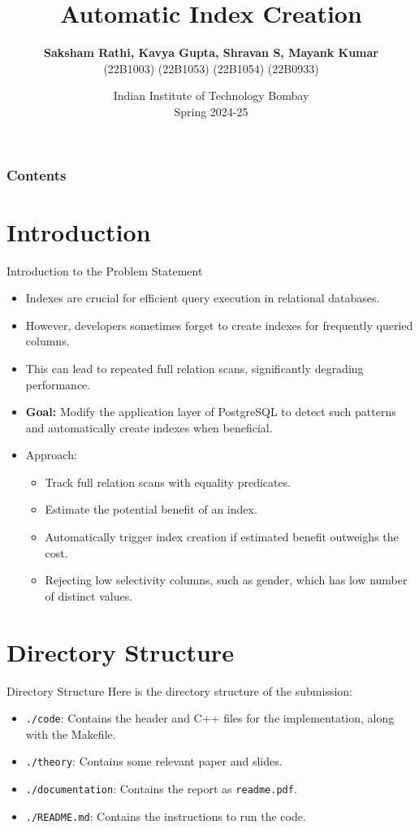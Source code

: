 \documentclass[Serif, 10pt, brown]{beamer}
\title[{DBIS}]{\sc Automatic Index Creation}
\author[\ul{Authors}]{{\bf { Saksham Rathi, Kavya Gupta, Shravan S, Mayank Kumar}}\\ {\footnotesize \hspace{0cm} (22B1003) \hspace{1cm} (22B1053) \hspace{0.5cm} (22B1054) \hspace{0.5cm} (22B0933)}}
\institute[UTD]{\sc\small CS349: DataBase and Information Systems\\ Under Prof. Sudarshan and Prof. Suraj}
\date[UCI]{Indian Institute of Technology Bombay \\ Spring 2024-25}
\theoremstyle{example}
\theoremstyle{plain}
\begin{document}
\frame{\titlepage}
%
%


\begin{frame}
	\transblindsvertical
	\frametitle{Contents}
	\tableofcontents[hidesubsections]
\end{frame}
\section{Introduction}
\begin{frame}{Introduction to the Problem Statement}

	\begin{itemize}
		\item Indexes are crucial for efficient query execution in relational databases.
		\item However, developers sometimes forget to create indexes for frequently queried columns.
		\item This can lead to repeated full relation scans, significantly degrading performance.
		\item {\bf Goal:} Modify the application layer of PostgreSQL to detect such patterns and automatically create indexes when beneficial.
		\item Approach:
		\begin{itemize}
			\item Track full relation scans with equality predicates.
			\item Estimate the potential benefit of an index.
			\item Automatically trigger index creation if estimated benefit outweighs the cost.
			\item Rejecting low selectivity columns, such as gender, which has low number of distinct values.
		\end{itemize}
	\end{itemize}
\end{frame}

\section{Directory Structure}
\begin{frame}{Directory Structure}
	Here is the directory structure of the submission:
	\begin{itemize}
		\item \texttt{./code}: Contains the header and C++ files for the implementation, along with the Makefile.
		\item \texttt{./theory}: Contains some relevant paper and slides.
		\item \texttt{./documentation}: Contains the report as \texttt{readme.pdf}.
		\item \texttt{./README.md}: Contains the instructions to run the code.
	\end{itemize}
\end{frame}
\end{document}
